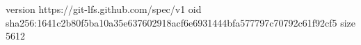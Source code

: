 version https://git-lfs.github.com/spec/v1
oid sha256:1641c2b80f5ba10a35e637602918acf6e6931444bfa577797c70792c61f92cf5
size 5612

